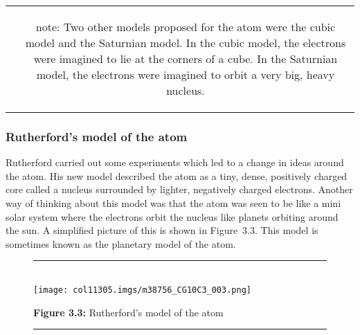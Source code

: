       \label{m38756*eip-956}
\begin{tabular}{cc}
	\hspace*{-50pt}\raisebox{-8 mm}{\hspace{-0.2in}\texttt{[image: col11305.imgs/psfact2.png]} } & 
	\begin{minipage}{0.85\textwidth}
	\begin{note}
      {note: }Two other models proposed for the atom were the cubic model and the Saturnian model. In the cubic model, the electrons were imagined to lie at the corners of a cube. In the Saturnian model, the electrons were imagined to orbit a very big, heavy nucleus.
	\end{note}
	\end{minipage}
	\end{tabular}
	\par
      \label{m38756*uid3}
            \subsubsection{ Rutherford's model of the atom}
            \nopagebreak
            \label{m38756*id254751}Rutherford carried out some experiments which led to a change in ideas around the atom. His new model described the atom as a tiny, dense, positively charged core called a nucleus surrounded by lighter, negatively charged electrons. Another way of thinking about this model was that the atom was seen to be like a mini solar system where the electrons orbit the nucleus like planets orbiting around the sun. A simplified picture of this is shown in Figure~3.3. This model is sometimes known as the planetary model of the atom.\par 
    \setcounter{subfigure}{0}
	\begin{figure}[H] %
    \begin{center}
    \rule[.1in]{\figurerulewidth}{.005in} \\
        \label{m38756*uid5!!!underscore!!!media}\label{m38756*uid5!!!underscore!!!printimage}\texttt{[image: col11305.imgs/m38756\_CG10C3\_003.png]} %
      \vspace{2pt}
    \vspace{\rubberspace}\par \begin{cnxcaption}
	  \small \textbf{Figure 3.3: }Rutherford's model of the atom
	\end{cnxcaption}
    \vspace{.1in}
    \rule[.1in]{\figurerulewidth}{.005in} \\
    \end{center}
 \end{figure}       
      \label{m38756*uid6}
